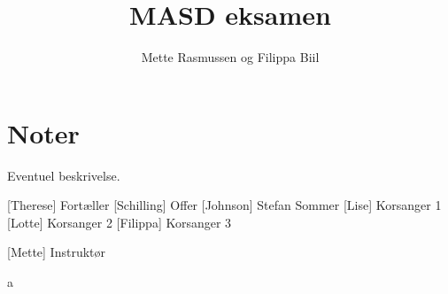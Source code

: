 \documentclass{article}
\title{MASD eksamen}                   %
\author{Mette Rasmussen og Filippa Biil}  %
\begin{document}
                
\maketitle
\section*{Noter}                %
Eventuel beskrivelse.

\begin{roles}
[Therese] Fortæller
[Schilling] Offer
[Johnson] Stefan Sommer
[Lise] Korsanger 1
[Lotte] Korsanger 2
[Filippa] Korsanger 3

[Mette] Instruktør
\end{roles}

\begin{props}
     a
\end{props}

\newpage%
\end{document}

